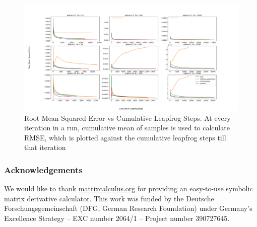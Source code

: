 \documentclass[11pt]{article}
\begin{document}
\begin{figure}[t!]
    \centering
    \includegraphics[width=1.2\textwidth]{figures/simplex/rmse.png}
    \caption{Root Mean Squared Error vs Cumulative Leapfrog Steps. At every iteration in a run, cumulative mean of samples is used to calculate RMSE, which is plotted against the cumulative leapfrog steps till that iteration}
    \label{fig:rmse}
\end{figure}

\subsubsection*{Acknowledgements}

We would like to thank \url{matrixcalculus.org} for providing an
easy-to-use symbolic matrix derivative calculator.
This work was funded by the Deutsche Forschungsgemeinschaft (DFG, German Research Foundation) under Germany’s Excellence Strategy – EXC number 2064/1 – Project number 390727645.


{}



\end{document}
